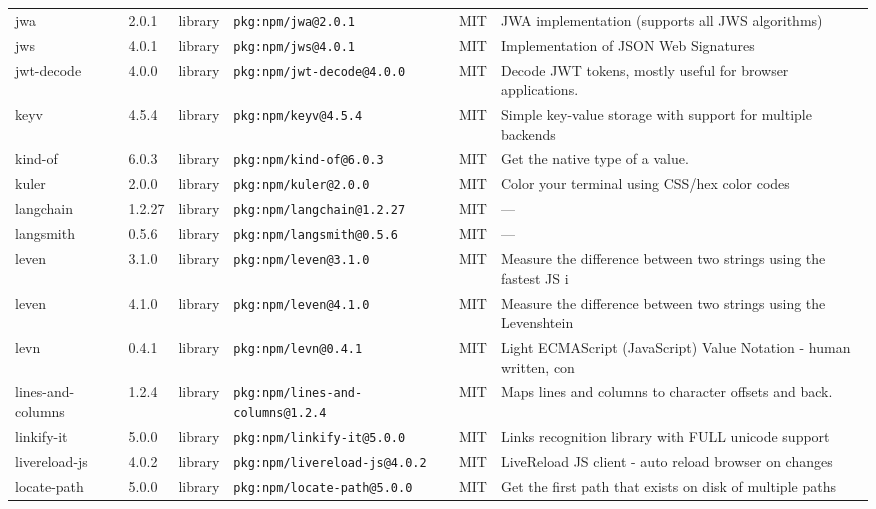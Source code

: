 \documentclass[11pt,a4paper]{article}
\begin{document}
\begin{longtable}{|p{4cm}|p{2cm}|p{1.6cm}|p{5cm}|p{1.5cm}|p{3.5cm}|}
\raggedright jwa & 2.0.1 & library & \small\texttt{pkg:npm/jwa@2.0.1} & MIT & \small JWA implementation (supports all JWS algorithms) \\
\raggedright jws & 4.0.1 & library & \small\texttt{pkg:npm/jws@4.0.1} & MIT & \small Implementation of JSON Web Signatures \\
\raggedright jwt-decode & 4.0.0 & library & \small\texttt{pkg:npm/jwt-decode@4.0.0} & MIT & \small Decode JWT tokens, mostly useful for browser applications. \\
\raggedright keyv & 4.5.4 & library & \small\texttt{pkg:npm/keyv@4.5.4} & MIT & \small Simple key-value storage with support for multiple backends \\
\raggedright kind-of & 6.0.3 & library & \small\texttt{pkg:npm/kind-of@6.0.3} & MIT & \small Get the native type of a value. \\
\raggedright kuler & 2.0.0 & library & \small\texttt{pkg:npm/kuler@2.0.0} & MIT & \small Color your terminal using CSS/hex color codes \\
\raggedright langchain & 1.2.27 & library & \small\texttt{pkg:npm/langchain@1.2.27} & MIT & \small — \\
\raggedright langsmith & 0.5.6 & library & \small\texttt{pkg:npm/langsmith@0.5.6} & MIT & \small — \\
\raggedright leven & 3.1.0 & library & \small\texttt{pkg:npm/leven@3.1.0} & MIT & \small Measure the difference between two strings using the fastest JS i \\
\raggedright leven & 4.1.0 & library & \small\texttt{pkg:npm/leven@4.1.0} & MIT & \small Measure the difference between two strings using the Levenshtein  \\
\raggedright levn & 0.4.1 & library & \small\texttt{pkg:npm/levn@0.4.1} & MIT & \small Light ECMAScript (JavaScript) Value Notation - human written, con \\
\raggedright lines-and-columns & 1.2.4 & library & \small\texttt{pkg:npm/lines-and-columns@1.2.4} & MIT & \small Maps lines and columns to character offsets and back. \\
\raggedright linkify-it & 5.0.0 & library & \small\texttt{pkg:npm/linkify-it@5.0.0} & MIT & \small Links recognition library with FULL unicode support \\
\raggedright livereload-js & 4.0.2 & library & \small\texttt{pkg:npm/livereload-js@4.0.2} & MIT & \small LiveReload JS client - auto reload browser on changes \\
\raggedright locate-path & 5.0.0 & library & \small\texttt{pkg:npm/locate-path@5.0.0} & MIT & \small Get the first path that exists on disk of multiple paths \\

\end{longtable}
\end{document}
